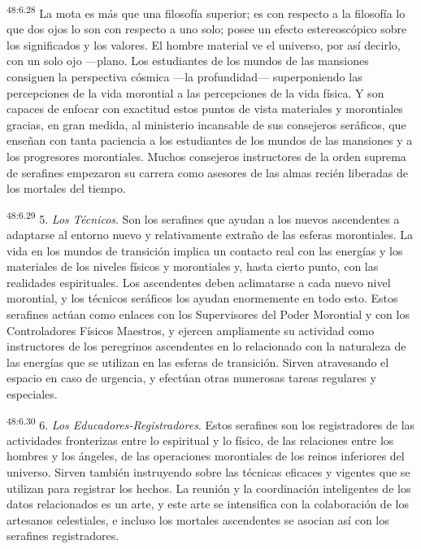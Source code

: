 \par
\textsuperscript{48:6.28} La mota es más que una filosofía superior; es con respecto a la filosofía lo que dos ojos lo son con respecto a uno solo; posee un efecto estereoscópico sobre los significados y los valores. El hombre material ve el universo, por así decirlo, con un solo ojo ---plano. Los estudiantes de los mundos de las mansiones consiguen la perspectiva cósmica ---la profundidad--- superponiendo las percepciones de la vida morontial a las percepciones de la vida física. Y son capaces de enfocar con exactitud estos puntos de vista materiales y morontiales gracias, en gran medida, al ministerio incansable de sus consejeros seráficos, que enseñan con tanta paciencia a los estudiantes de los mundos de las mansiones y a los progresores morontiales. Muchos consejeros instructores de la orden suprema de serafines empezaron su carrera como asesores de las almas recién liberadas de los mortales del tiempo.

\par
\textsuperscript{48:6.29} 5. \textit{Los Técnicos}. Son los serafines que ayudan a los nuevos ascendentes a adaptarse al entorno nuevo y relativamente extraño de las esferas morontiales. La vida en los mundos de transición implica un contacto real con las energías y los materiales de los niveles físicos y morontiales y, hasta cierto punto, con las realidades espirituales. Los ascendentes deben aclimatarse a cada nuevo nivel morontial, y los técnicos seráficos los ayudan enormemente en todo esto. Estos serafines actúan como enlaces con los Supervisores del Poder Morontial y con los Controladores Físicos Maestros, y ejercen ampliamente su actividad como instructores de los peregrinos ascendentes en lo relacionado con la naturaleza de las energías que se utilizan en las esferas de transición. Sirven atravesando el espacio en caso de urgencia, y efectúan otras numerosas tareas regulares y especiales.

\par
\textsuperscript{48:6.30} 6. \textit{Los Educadores-Registradores}. Estos serafines son los registradores de las actividades fronterizas entre lo espiritual y lo físico, de las relaciones entre los hombres y los ángeles, de las operaciones morontiales de los reinos inferiores del universo. Sirven también instruyendo sobre las técnicas eficaces y vigentes que se utilizan para registrar los hechos. La reunión y la coordinación inteligentes de los datos relacionados es un arte, y este arte se intensifica con la colaboración de los artesanos celestiales, e incluso los mortales ascendentes se asocian así con los serafines registradores.

